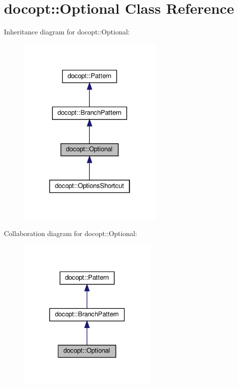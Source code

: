 \hypertarget{classdocopt_1_1Optional}{}\section{docopt\+:\+:Optional Class Reference}
\label{classdocopt_1_1Optional}


Inheritance diagram for docopt\+:\+:Optional\+:
\nopagebreak
\begin{figure}[H]
\begin{center}
\leavevmode
\includegraphics[width=202pt]{classdocopt_1_1Optional__inherit__graph}
\end{center}
\end{figure}


Collaboration diagram for docopt\+:\+:Optional\+:
\nopagebreak
\begin{figure}[H]
\begin{center}
\leavevmode
\includegraphics[width=194pt]{classdocopt_1_1Optional__coll__graph}
\end{center}
\end{figure}
